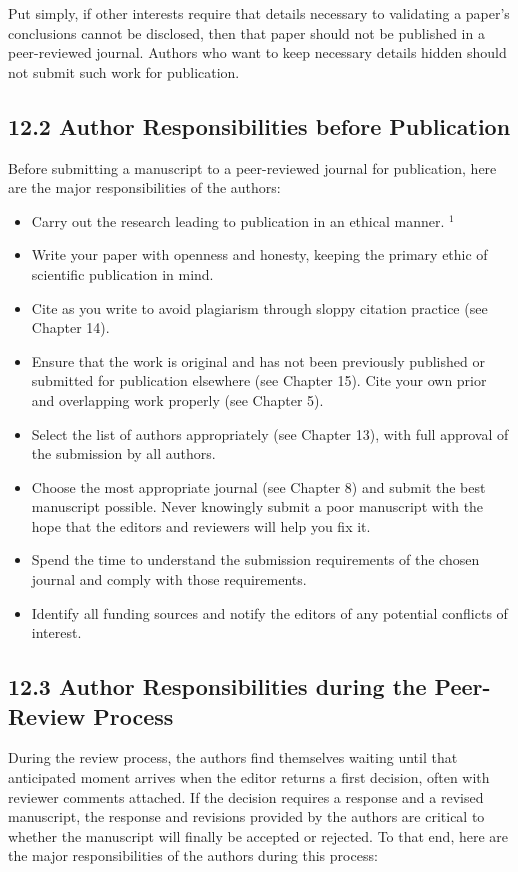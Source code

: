 Put simply, if other interests require that details necessary to validating a paper's conclusions cannot be disclosed, then that paper should not be published in a peer-reviewed journal. Authors who want to keep necessary details hidden should not submit such work for publication.

\subsection*{12.2 Author Responsibilities before Publication}
Before submitting a manuscript to a peer-reviewed journal for publication, here are the major responsibilities of the authors:

\begin{itemize}
  \item Carry out the research leading to publication in an ethical manner. ${ }^{1}$
  \item Write your paper with openness and honesty, keeping the primary ethic of scientific publication in mind.
  \item Cite as you write to avoid plagiarism through sloppy citation practice (see Chapter 14).
  \item Ensure that the work is original and has not been previously published or submitted for publication elsewhere (see Chapter 15). Cite your own prior and overlapping work properly (see Chapter 5).
  \item Select the list of authors appropriately (see Chapter 13), with full approval of the submission by all authors.
  \item Choose the most appropriate journal (see Chapter 8) and submit the best manuscript possible. Never knowingly submit a poor manuscript with the hope that the editors and reviewers will help you fix it.
  \item Spend the time to understand the submission requirements of the chosen journal and comply with those requirements.
  \item Identify all funding sources and notify the editors of any potential conflicts of interest.
\end{itemize}

\subsection*{12.3 Author Responsibilities during the Peer-Review Process}
During the review process, the authors find themselves waiting until that anticipated moment arrives when the editor returns a first decision, often with reviewer comments attached. If the decision requires a response and a revised manuscript, the response and revisions provided by the authors are critical to whether the manuscript will finally be accepted or rejected. To that end, here are the major responsibilities of the authors during this process:

